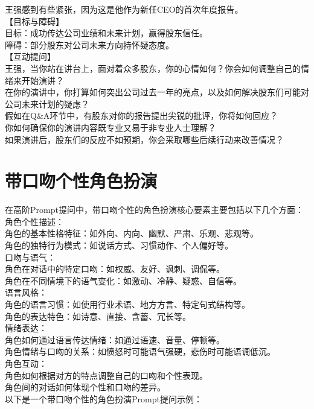 \documentclass[12pt]{book}
\begin{document}
王强感到有些紧张，因为这是他作为新任CEO的首次年度报告。\\
【目标与障碍】\\

目标：成功传达公司业绩和未来计划，赢得股东信任。\\
障碍：部分股东对公司未来方向持怀疑态度。\\
【互动提问】\\

王强，当你站在讲台上，面对着众多股东，你的心情如何？你会如何调整自己的情绪来开始演讲？\\
在你的演讲中，你打算如何突出公司过去一年的亮点，以及如何解决股东们可能对公司未来计划的疑虑？\\
假如在Q\&A环节中，有股东对你的报告提出尖锐的批评，你将如何回应？\\
你如何确保你的演讲内容既专业又易于非专业人士理解？\\
如果演讲后，股东们的反应不如预期，你会采取哪些后续行动来改善情况？\\

\section{带口吻个性角色扮演}
在高阶Prompt提问中，带口吻个性的角色扮演核心要素主要包括以下几个方面：\\

角色个性描述：\\
角色的基本性格特征：如外向、内向、幽默、严肃、乐观、悲观等。\\
角色的独特行为模式：如说话方式、习惯动作、个人偏好等。\\
口吻与语气：\\
角色在对话中的特定口吻：如权威、友好、讽刺、调侃等。\\
角色在不同情境下的语气变化：如激动、冷静、疑惑、自信等。\\
语言风格：\\
角色的语言习惯：如使用行业术语、地方方言、特定句式结构等。\\
角色的表达特色：如诗意、直接、含蓄、冗长等。\\
情绪表达：\\
角色如何通过语言传达情绪：如通过语速、音量、停顿等。\\
角色情绪与口吻的关系：如愤怒时可能语气强硬，悲伤时可能语调低沉。\\
角色互动：\\
角色如何根据对方的特点调整自己的口吻和个性表现。\\
角色间的对话如何体现个性和口吻的差异。\\
以下是一个带口吻个性的角色扮演Prompt提问示例：\\
\end{document}
